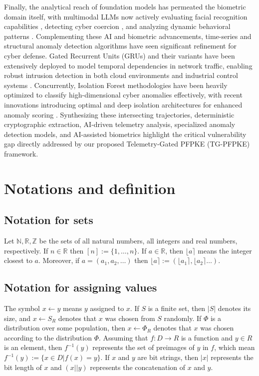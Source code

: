 \documentclass[pdflatex,sn-mathphys-num]{sn-jnl}
\theoremstyle{thmstyleone}%
\theoremstyle{thmstyletwo}%
\theoremstyle{thmstylethree}%
\begin{document}
Finally, the analytical reach of foundation models has permeated the biometric domain itself, with multimodal LLMs now actively evaluating facial recognition capabilities \cite{bib16}, detecting cyber coercion \cite{bib17}, and analyzing dynamic behavioral patterns \cite{bib18}. Complementing these AI and biometric advancements, time-series and structural anomaly detection algorithms have seen significant refinement for cyber defense. Gated Recurrent Units (GRUs) and their variants have been extensively deployed to model temporal dependencies in network traffic, enabling robust intrusion detection in both cloud environments and industrial control systems \cite{bib33,bib34,bib36,bib38}. Concurrently, Isolation Forest methodologies have been heavily optimized to classify high-dimensional cyber anomalies effectively, with recent innovations introducing optimal and deep isolation architectures for enhanced anomaly scoring \cite{bib31,bib32,bib35,bib37}. Synthesizing these intersecting trajectories, deterministic cryptographic extraction, AI-driven telemetry analysis, specialized anomaly detection models, and AI-assisted biometrics highlight the critical vulnerability gap directly addressed by our proposed Telemetry-Gated PFPKE (TG-PFPKE) framework.

\section{Notations and definition}\label{sec3}
\subsection{Notation for sets}
Let $\mathbb{N}, \mathbb{R}, \mathbb{Z}$ be the sets of all natural numbers, all integers and real numbers, respectively. If $n \in \mathbb{R}$ then $[n] := \{1, \dots, n\}$. If $a \in \mathbb{R}$, then $\lfloor a \rceil$ means the integer closest to $a$. Moreover, if $a = (a_1, a_2, \dots)$ then $\lfloor a \rceil := (\lfloor a_1 \rceil, \lfloor a_2 \rceil \dots)$.

\subsection{Notation for assigning values}

The symbol $x \leftarrow y$ means $y$ assigned to $x$. If $S$ is a finite set, then $|S|$ denotes its size, and $x \leftarrow S_R$ denotes that $x$ was chosen from $S$ randomly. If $\Phi$ is a distribution over some population, then $x \leftarrow \Phi_R$ denotes that $x$ was chosen according to the distribution $\Phi$. Assuming that $f : D \to R$ is a function and $y \in R$ is an element, then $f^{-1}(y)$ represents the set of preimages of $y$ in $f$, which mean $f^{-1}(y) := \{x \in D | f(x) = y\}$. If $x$ and $y$ are bit strings, then $|x|$ represents the bit length of $x$ and $(x || y)$ represents the concatenation of $x$ and $y$.
\end{document}
